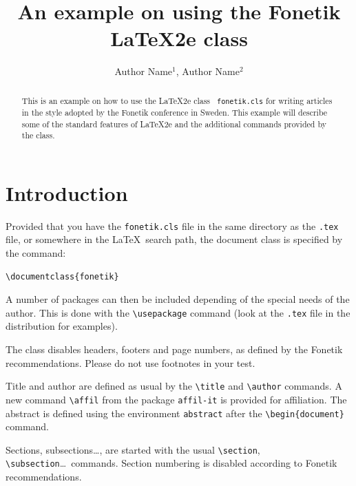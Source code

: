 \documentclass{fonetik}
\title{An example on using the Fonetik \LaTeX2e class}
\author{Author Name$^1$, Author Name$^2$}
\affil{$^1$KTH Royal Institute of Technology,\\
  $^2$Department, University, Country\\
  \normalfont\texttt{author@kth.se, author@dept.uni.co}
}
\begin{document}
\maketitle

\begin{abstract}
This is an example on how to use the \LaTeX2e class {\tt
  fonetik.cls} for writing articles in the style adopted by the Fonetik
conference in Sweden. This example will describe some of the standard features
of \LaTeX2e and the additional commands provided by the class.
\end{abstract}

\section{Introduction}
Provided that you have the \verb|fonetik.cls| file in the same directory
as the \verb|.tex| file, or somewhere in the \LaTeX\ search path, the
document class is specified by the command:
\begin{verbatim}
\documentclass{fonetik}
\end{verbatim}

A number of packages can then be included depending of the special
needs of the author. This is done with the \verb|\usepackage| command
(look at the \verb|.tex| file in the distribution for examples).

The class disables headers, footers and page numbers, as defined by the
Fonetik recommendations. Please do not use footnotes in your test.

Title and author are defined as usual by the \verb|\title| and
\verb|\author| commands. A new command \verb|\affil| from the package
\verb|affil-it| is provided for affiliation. The abstract is defined using
the environment \verb|abstract| after the \verb|\begin{document}|
command.

Sections, subsections\ldots, are started with the usual
\verb|\section|, \verb|\subsection|\ldots\ commands. Section numbering is
disabled according to Fonetik recommendations.
\end{document}
